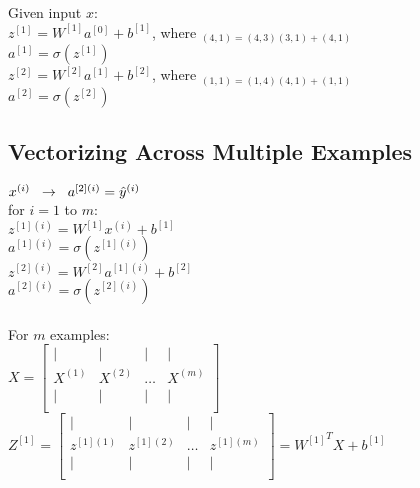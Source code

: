 \documentclass{article}
\begin{document}
Given input $x$:\\

$z^{[1]} = W^{[1]} a^{[0]} + b^{[1]}$, where $_{(4,1) = (4,3)(3,1)+ (4,1)}$\\

$a^{[1]} = \sigma(z^{[1]})$\\

$z^{[2]} = W^{[2]}a^{[1]} + b^{[2]}$, where $_{(1,1) = (1,4)(4,1)+ (1,1)}$\\

$a^{[2]} = \sigma(z^{[2]})$\\

\newpage
\subsection{Vectorizing Across Multiple Examples}

$x^{(i)} \hspace{2mm}\rightarrow \hspace{2mm} a^{[2](i)}= \hat{y}^{(i)}$\\

for $i=1$  to $m$:\\

$z^{[1](i)} = W^{[1]} x^{(i)} + b^{[1]}$\\

$a^{[1](i)} = \sigma(z^{[1](i)})$\\

$z^{[2](i)} = W^{[2]}a^{[1](i)} + b^{[2]}$\\

$a^{[2](i)} = \sigma(z^{[2](i)})$\\\\

For $m$ examples:\\

$X=
\begin{bmatrix}
    | & | & | & | \\
    X^{(1)} & X^{(2)} & \dots & X^{(m)} \\
    | & | & | & | \\
\end{bmatrix}$\\

$Z^{[1]}=
\begin{bmatrix}
    | & | & | & | \\
    z^{[1](1)} & z^{[1](2)} & \dots & z^{[1](m)} \\
    | & | & | & | \\
\end{bmatrix} = {W^{[1]}}^T X + b^{[1]}$\\
\end{document}
